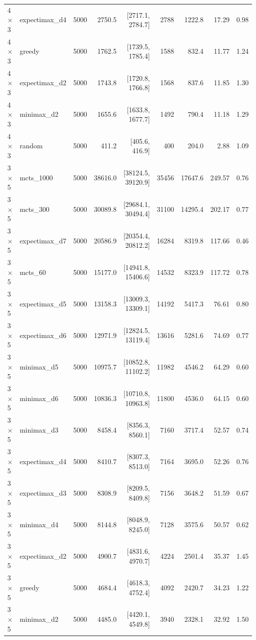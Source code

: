 {\begin{longtable}{llrrrrrrr}
4$\times$3 & expectimax\_d4 & 5000 & 2750.5 & [2717.1, 2784.7] & 2788 & 1222.8 & 17.29 & 0.98 \\
4$\times$3 & greedy & 5000 & 1762.5 & [1739.5, 1785.4] & 1588 & 832.4 & 11.77 & 1.24 \\
4$\times$3 & expectimax\_d2 & 5000 & 1743.8 & [1720.8, 1766.8] & 1568 & 837.6 & 11.85 & 1.30 \\
4$\times$3 & minimax\_d2 & 5000 & 1655.6 & [1633.8, 1677.7] & 1492 & 790.4 & 11.18 & 1.29 \\
4$\times$3 & random & 5000 & 411.2 & [405.6, 416.9] & 400 & 204.0 & 2.88 & 1.09 \\
\midrule
3$\times$5 & mcts\_1000 & 5000 & 38616.0 & [38124.5, 39120.9] & 35456 & 17647.6 & 249.57 & 0.76 \\
3$\times$5 & mcts\_300 & 5000 & 30089.8 & [29684.1, 30494.4] & 31100 & 14295.4 & 202.17 & 0.77 \\
3$\times$5 & expectimax\_d7 & 5000 & 20586.9 & [20354.4, 20812.2] & 16284 & 8319.8 & 117.66 & 0.46 \\
3$\times$5 & mcts\_60 & 5000 & 15177.0 & [14941.8, 15406.6] & 14532 & 8323.9 & 117.72 & 0.78 \\
3$\times$5 & expectimax\_d5 & 5000 & 13158.3 & [13009.3, 13309.1] & 14192 & 5417.3 & 76.61 & 0.80 \\
3$\times$5 & expectimax\_d6 & 5000 & 12971.9 & [12824.5, 13119.4] & 13616 & 5281.6 & 74.69 & 0.77 \\
3$\times$5 & minimax\_d5 & 5000 & 10975.7 & [10852.8, 11102.2] & 11982 & 4546.2 & 64.29 & 0.60 \\
3$\times$5 & minimax\_d6 & 5000 & 10836.3 & [10710.8, 10963.8] & 11800 & 4536.0 & 64.15 & 0.60 \\
3$\times$5 & minimax\_d3 & 5000 & 8458.4 & [8356.3, 8560.1] & 7160 & 3717.4 & 52.57 & 0.74 \\
3$\times$5 & expectimax\_d4 & 5000 & 8410.7 & [8307.3, 8513.0] & 7164 & 3695.0 & 52.26 & 0.76 \\
3$\times$5 & expectimax\_d3 & 5000 & 8308.9 & [8209.5, 8409.8] & 7156 & 3648.2 & 51.59 & 0.67 \\
3$\times$5 & minimax\_d4 & 5000 & 8144.8 & [8048.9, 8245.0] & 7128 & 3575.6 & 50.57 & 0.62 \\
3$\times$5 & expectimax\_d2 & 5000 & 4900.7 & [4831.6, 4970.7] & 4224 & 2501.4 & 35.37 & 1.45 \\
3$\times$5 & greedy & 5000 & 4684.4 & [4618.3, 4752.4] & 4092 & 2420.7 & 34.23 & 1.22 \\
3$\times$5 & minimax\_d2 & 5000 & 4485.0 & [4420.1, 4549.8] & 3940 & 2328.1 & 32.92 & 1.50 \\

\end{longtable}}
